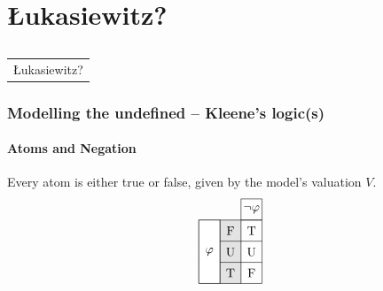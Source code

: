 \documentclass[xcolor=x11names]{beamer}
\makeatletter
\let\beamer@writeslidentry@miniframeson=\beamer@writeslidentry
\def\beamer@writeslidentry@miniframesoff{%
  \expandafter\beamer@ifempty\expandafter{\beamer@framestartpage}{}%
  {%
    \clearpage\beamer@notesactions%
  }
}
\newcommand*{\miniframeson}{\let\beamer@writeslidentry=\beamer@writeslidentry@miniframeson}
\newcommand*{\miniframesoff}{\let\beamer@writeslidentry=\beamer@writeslidentry@miniframesoff}
\newcommand{\cimdia}[1] {\miniframesoff \begin{frame}\begin{center}\huge \begin{tabular}{c}#1\end{tabular}\end{center}\end{frame}\miniframeson}
\newcommand{\szakasz}[2][]{\section{#1}\subsection{}\cimdia{#2}}
\makeatother
\begin{document}
\szakasz[{\L}ukasiewitz?]{{\L}ukasiewitz?}
\begin{frame}
	\frametitle{Modelling the undefined -- Kleene's logic(s)}
	\framesubtitle{Atoms and Negation}
Every atom is either true or false, given by the model's valuation $V$.
\[\begin{tikzpicture}[scale=.6]
\draw [step=1cm] (-1,-4) node (v1) {} grid (2,-1) node (v2) {};
\draw[fill=white]  (v1) rectangle (0,-1);
\draw  (v2) rectangle (1,0);
\draw[fill=black, opacity=.1]  (1,-1) rectangle (0,-4);
\node at (1.5,-0.5) {$\lnot \varphi$};
\node at (-0.5,-2.5) {$\varphi$};
\node at (0.5,-1.5) {F};
\node at (0.5,-2.5) {U};
\node at (0.5,-3.5) {T};
\node at (1.5,-1.5) {T};
\node at (1.5,-2.5) {U};
\node at (1.5,-3.5) {F};
\end{tikzpicture}
\]
\end{frame}
\end{document}
